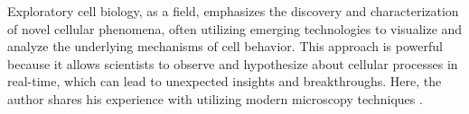 


%
\label{sec:summarising_discussion}%
% 
% 
%
\label{sec:discussion_potential_breakthroughs}%
Exploratory cell biology, as a field, emphasizes the discovery and
characterization of novel cellular phenomena, often utilizing emerging
technologies to visualize and analyze the underlying mechanisms of cell
behavior. This approach is powerful because it allows scientists to observe and
hypothesize about cellular processes in real-time, which can lead to unexpected
insights and breakthroughs. Here, the author shares his experience with
utilizing modern microscopy techniques . 


